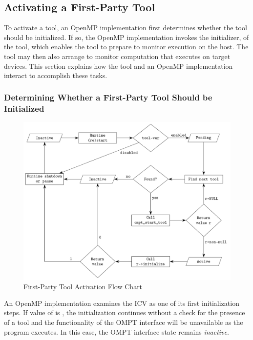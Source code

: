 \subsection{Activating a First-Party Tool}
\label{sec:ompt-initialization}

To activate a tool, an OpenMP implementation first determines whether 
the tool should be initialized. If so, the OpenMP implementation invokes 
the initializer, of the tool, which enables the tool to prepare to monitor 
execution on the host. The tool may then also arrange to monitor computation 
that executes on target devices. This section explains how the tool and an
OpenMP implementation interact to accomplish these tasks.





\subsubsection{Determining Whether a First-Party Tool Should be Initialized}
\label{sec:ompt-check-tool}

\begin{figure}[h]
  \centering
  \includegraphics[width=.9\linewidth]{tool_support/ompt_flow_chart.pdf}
  \caption{First-Party Tool Activation Flow Chart}
  \label{fig:ompt_diagram}
\end{figure}

An OpenMP implementation examines the  ICV as one of its first 
initialization steps. If value of  is , the 
initialization continues without a check for the presence of a tool and 
the functionality of the OMPT interface will be unavailable as the program 
executes. In this case, the OMPT interface state remains \emph{inactive}.

